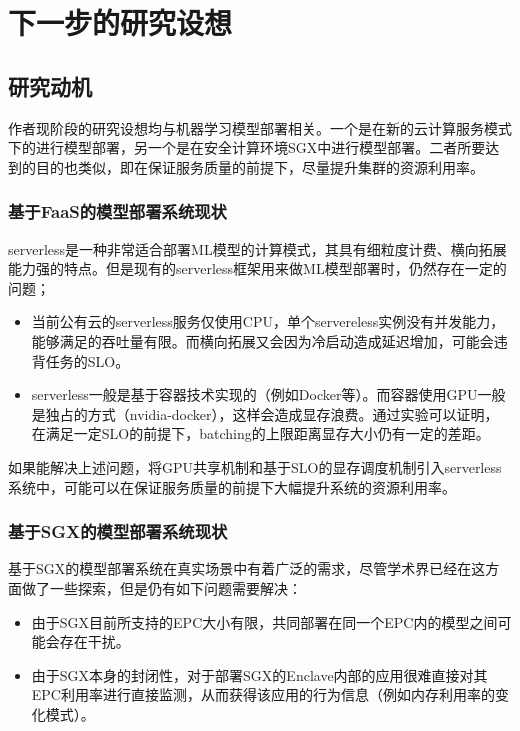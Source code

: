 \chapter{下一步的研究设想}

\section{研究动机}

作者现阶段的研究设想均与机器学习模型部署相关。一个是在新的云计算服务模式下的进行模型部署，另一个是在安全计算环境SGX中进行模型部署。二者所要达到的目的也类似，即在保证服务质量的前提下，尽量提升集群的资源利用率。

\subsection{基于FaaS的模型部署系统现状}
serverless是一种非常适合部署ML模型的计算模式，其具有细粒度计费、横向拓展能力强的特点。但是现有的serverless框架用来做ML模型部署时，仍然存在一定的问题；
\begin{itemize}
    \item 当前公有云的serverless服务仅使用CPU，单个servereless实例没有并发能力，能够满足的吞吐量有限。而横向拓展又会因为冷启动造成延迟增加，可能会违背任务的SLO。
    \item serverless一般是基于容器技术实现的（例如Docker等）。而容器使用GPU一般是独占的方式（nvidia-docker），这样会造成显存浪费。通过实验可以证明，在满足一定SLO的前提下，batching的上限距离显存大小仍有一定的差距。
\end{itemize}

如果能解决上述问题，将GPU共享机制和基于SLO的显存调度机制引入serverless系统中，可能可以在保证服务质量的前提下大幅提升系统的资源利用率。

\subsection{基于SGX的模型部署系统现状}
基于SGX的模型部署系统在真实场景中有着广泛的需求，尽管学术界已经在这方面做了一些探索，但是仍有如下问题需要解决：
\begin{itemize}
    \item 由于SGX目前所支持的EPC大小有限，共同部署在同一个EPC内的模型之间可能会存在干扰。
    \item 由于SGX本身的封闭性，对于部署SGX的Enclave内部的应用很难直接对其EPC利用率进行直接监测，从而获得该应用的行为信息（例如内存利用率的变化模式）。
\end{itemize}


